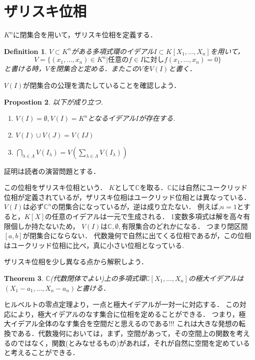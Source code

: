 \documentclass{ujarticle}
\newtheorem{thm}{Theorem}[section]
\newtheorem{dfn}[thm]{Definition}
\newtheorem{prop}[thm]{Propostion}
\begin{document}
\section{ザリスキ位相}
\label{sub:ザリスキ位相}

$K^n$に閉集合を用いて，ザリスキ位相を定義する．
\begin{dfn}
 $V \subset K^n$がある多項式環のイデアル$I \subset K[X_1,\dots,X_n]$を用いて，
\begin{equation*}
   V = \{ (x_1,\dots,x_n) \in K^n | \mbox{任意の} f \in I \mbox{に対し} f(x_1, \dots,x_n)=0 \}
\end{equation*}
と書ける時，$V$を閉集合と定める．またこの$V$を$V(I)$と書く．
\end{dfn}

$V(I)$が閉集合の公理を満たしていることを確認しよう．
\begin{prop}
 以下が成り立つ.
 \begin{enumerate}
   \item $V(I) = \emptyset ,　V(I) = K^n$となるイデアル$I$が存在する.
   \item $V(I) \cup V(J) = V(IJ)$
   \item $\bigcap_{\lambda \in \Lambda}V(I_{\lambda})=V(\sum_{\lambda \in \Lambda}V(I_\lambda))$
 \end{enumerate}
\end{prop}
証明は読者の演習問題とする．

この位相をザリスキ位相という．
$K$として$\mathbb{C}$を取る．$\mathbb{C}$には自然にユークリッド位相が定義されているが，ザリスキ位相はユークリッド位相とは異なっている．$V(I)$は必ず$\mathbb{C}^n$の閉集合になっているが，逆は成り立たない．
例えば,$n=1$とすると，$K[X]$の任意のイデアルは一元で生成される．
1変数多項式は解を高々有限個しか持たないため，
$V(I)$は$\mathbb{C},\emptyset,$有限集合のどれかになる．
つまり閉区間$[a,b]$が閉集合にならない．
代数幾何で自然に出てくる位相であるが，この位相はユークリッド位相に比べ，真に小さい位相となっている.


ザリスキ位相を少し異なる点から解釈しよう．
\begin{thm}
 $\mathbb{C}$(代数閉体でよい)上の多項式環$\mathbb{C}[X_1,\dots,X_n]$の極大イデアルは$(X_1 -a_1, \dots ,X_n - a_n)$と書ける．
\end{thm}

ヒルベルトの零点定理より，一点と極大イデアルが一対一に対応する．
この対応により，極大イデアルのなす集合に位相を定めることができる．
つまり，極大イデアル全体のなす集合を空間だと思えるのである!!!
これは大きな発想の転換である．代数幾何においては，まず，空間があって，その空間上の関数を考えるのではなく，関数(とみなせるもの)があれば，それが自然に空間を定めていると考えることができる．
\end{document}
